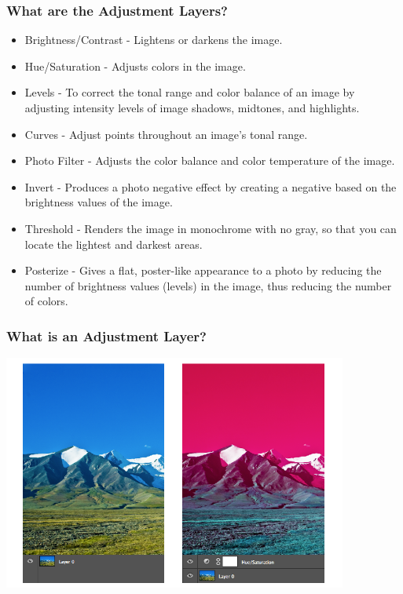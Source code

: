 \documentclass{beamer}
\begin{document}
\begin{frame}
	\frametitle{What are the Adjustment Layers?}
	\begin{itemize}
		\item Brightness/Contrast - Lightens or darkens the image.
		\item Hue/Saturation - Adjusts colors in the image.
		\item Levels - To correct the tonal range and color balance of an image by adjusting intensity levels of image shadows, midtones, and highlights. 
		\item Curves - Adjust points throughout an image’s tonal range. 
		\item Photo Filter - Adjusts the color balance and color temperature of the image.
		\item Invert - Produces a photo negative effect by creating a negative based on the brightness values of the image.
		\item Threshold - Renders the image in monochrome with no gray, so that you can locate the lightest and darkest areas.
		\item Posterize - Gives a flat, poster-like appearance to a photo by reducing the number of brightness values (levels) in the image, thus reducing the number of colors.

	\end{itemize}
\end{frame}

\begin{frame}
	\frametitle{What is an Adjustment Layer?}
	\begin{center}
	\includegraphics[width = 0.85\textwidth]{images/adjustmentLayer_PS.png}
\end{center}
\end{frame}
\end{document}
